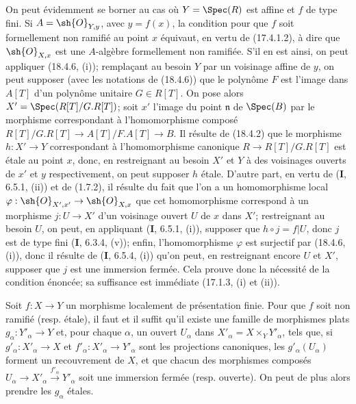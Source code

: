 On peut évidemment se borner au cas où $Y=\Spec(R)$ est affine et $f$ de type fini. Si $A=\sh{O}_{Y,y}$, avec $y=f(x)$, la condition pour que $f$ soit formellement non ramifié au point $x$ équivaut, en vertu de (17.4.1.2), à dire que $\sh{O}_{X,x}$ est une $A$-algèbre formellement non ramifiée. S'il en est ainsi, on peut appliquer (18.4.6, (i)); remplaçant au besoin $Y$ par un voisinage affine de $y$, on peut supposer (avec les notations de (18.4.6)) que le polynôme $F$ est l'image dans $A[T]$ d'un polynôme unitaire $G\in R[T]$. On pose alors $X'=\Spec(R[T]/G.R[T])$; soit $x'$ l'image du point $\mathfrak n$ de $\Spec(B)$ par le morphisme correspondant à l'homomorphisme composé $R[T]/G.R[T]\to A[T]/F.A[T]\to B$. Il résulte de (18.4.2) que le morphisme $h:X'\to Y$ correspondant à l'homomorphisme canonique $R\to R[T]/G.R[T]$ est étale au point $x$, donc, en restreignant au besoin $X'$ et $Y$ à des voisinages ouverts de $x'$ et $y$ respectivement, on peut supposer $h$ étale. D'autre part, en vertu de (\textbf{I}, 6.5.1, (ii)) et de (1.7.2), il résulte du fait que l'on a un homomorphisme local $\varphi:\sh{O}_{X',x'}\to\sh{O}_{X,x}$ que cet homomorphisme correspond à un morphisme
$j:U\to X'$ d'un voisinage ouvert $U$ de $x$ dans $X'$; restreignant au besoin $U$, on peut, en appliquant (\textbf{I}, 6.5.1, (i)), supposer que $h\circ j=f|U$, donc $j$ est de type fini (\textbf{I}, 6.3.4, (v)); enfin, l'homomorphisme $\varphi$ est surjectif par (18.4.6, (i)), donc il résulte de (\textbf{I}, 6.5.4, (i)) qu'on peut, en restreignant encore $U$ et $X'$, supposer que $j$ est une immersion fermée. Cela prouve donc la nécessité de la condition énoncée; sa suffisance est immédiate (17.1.3, (i) et (ii)).

\begin{corollary}[18.4.8]
\label{IV.18.4.8}
Soit $f:X\to Y$ un morphisme localement de présentation finie. Pour que $f$ soit non ramifié \textup{(resp.} étale\textup{)}, il faut et il suffit qu'il existe une famille de morphismes plats $g_\alpha:Y'_\alpha\to Y$ et, pour chaque $\alpha$, un ouvert $U_\alpha$ dans $X'_\alpha=X\times_Y Y'_\alpha$, tels que, si $g'_\alpha:X'_\alpha\to X$ et $f'_\alpha:X'_\alpha\to Y'_\alpha$ sont les projections canoniques, les $g'_\alpha(U_\alpha)$ forment un recouvrement de $X$, et que chacun des morphismes composés $U_\alpha\to X'_\alpha\xrightarrow{f'_\alpha}Y'_\alpha$ soit une immersion fermée \textup{(resp.} ouverte\textup{)}. On peut de plus alors prendre les $g_\alpha$ étales.
\end{corollary}


